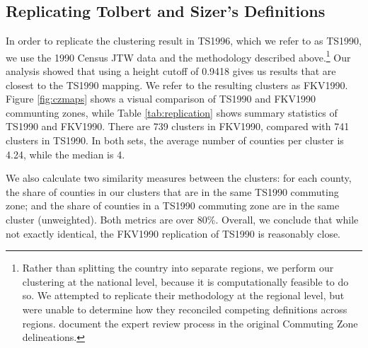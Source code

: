 \subsection{Replicating Tolbert and Sizer's Definitions}





In order to replicate the clustering result in TS1996, which we refer to as TS1990, we use the 1990 Census JTW data and the methodology described above.\footnote{Rather than splitting the country into separate regions, we perform our clustering at the national level, because it is computationally feasible to do so. We attempted to replicate their methodology at the regional level, but were unable to determine how they reconciled competing definitions across regions. \cite{FowlerRhubartJensen2016} document the expert review process in the original Commuting Zone delineations.} 
Our analysis showed that using a height cutoff of 0.9418 gives us results that are closest to the TS1990 mapping. We refer to the resulting clusters as FKV1990. Figure \ref{fig:czmaps} shows a visual comparison of TS1990 and FKV1990 communting zones, while Table \ref{tab:replication} shows summary statistics of TS1990 and FKV1990. There are 739 clusters in FKV1990, compared with  741 clusters in TS1990. In both sets, the average number of counties per cluster is 4.24, while the median is 4.

We also calculate two similarity measures between the clusters: for each county, the share of counties in our clusters that are in the same TS1990 commuting zone; and the share of counties in a TS1990 commuting zone are in the same cluster (unweighted). Both metrics are  over 80\%. Overall, we conclude that while not exactly identical, the FKV1990 replication of TS1990 is reasonably close.

